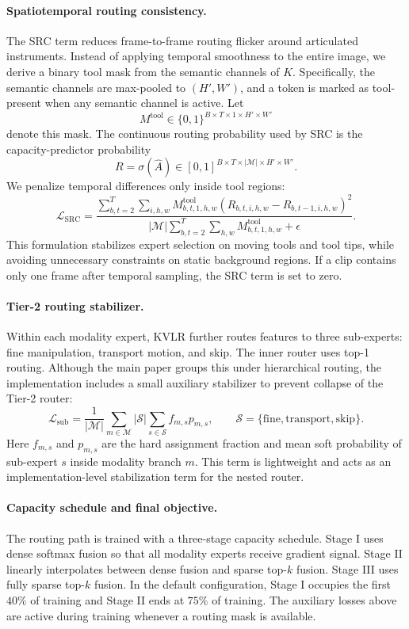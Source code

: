 \paragraph{Spatiotemporal routing consistency.}
The SRC term reduces frame-to-frame routing flicker around articulated instruments. Instead of applying temporal smoothness to the entire image, we derive a binary tool mask from the semantic channels of $K$. Specifically, the semantic channels are max-pooled to $(H',W')$, and a token is marked as tool-present when any semantic channel is active. Let
\[
    M^{\mathrm{tool}}\in\{0,1\}^{B\times T\times 1\times H'\times W'}
\]
denote this mask. The continuous routing probability used by SRC is the capacity-predictor probability
\[
    R=\sigma(\widehat{A})\in[0,1]^{B\times T\times |\mathcal{M}|\times H'\times W'} .
\]
We penalize temporal differences only inside tool regions:
\[
    \mathcal{L}_{\mathrm{SRC}}
    =
    \frac{
    \sum_{b,t=2}^{T}\sum_{i,h,w}
    M^{\mathrm{tool}}_{b,t,1,h,w}
    \left(R_{b,t,i,h,w}-R_{b,t-1,i,h,w}\right)^2
    }{
    |\mathcal{M}|\sum_{b,t=2}^{T}\sum_{h,w}M^{\mathrm{tool}}_{b,t,1,h,w}+\epsilon
    } .
\]
This formulation stabilizes expert selection on moving tools and tool tips, while avoiding unnecessary constraints on static background regions. If a clip contains only one frame after temporal sampling, the SRC term is set to zero.

\paragraph{Tier-2 routing stabilizer.}
Within each modality expert, KVLR further routes features to three sub-experts: fine manipulation, transport motion, and skip. The inner router uses top-1 routing. Although the main paper groups this under hierarchical routing, the implementation includes a small auxiliary stabilizer to prevent collapse of the Tier-2 router:
\[
    \mathcal{L}_{\mathrm{sub}}
    =
    \frac{1}{|\mathcal{M}|}\sum_{m\in\mathcal{M}}
    |\mathcal{S}|\sum_{s\in\mathcal{S}} f_{m,s}p_{m,s},
    \qquad
    \mathcal{S}=\{\mathrm{fine},\mathrm{transport},\mathrm{skip}\}.
\]
Here $f_{m,s}$ and $p_{m,s}$ are the hard assignment fraction and mean soft probability of sub-expert $s$ inside modality branch $m$. This term is lightweight and acts as an implementation-level stabilization term for the nested router.

\paragraph{Capacity schedule and final objective.}
The routing path is trained with a three-stage capacity schedule. Stage I uses dense softmax fusion so that all modality experts receive gradient signal. Stage II linearly interpolates between dense fusion and sparse top-$k$ fusion. Stage III uses fully sparse top-$k$ fusion. In the default configuration, Stage I occupies the first $40\%$ of training and Stage II ends at $75\%$ of training. The auxiliary losses above are active during training whenever a routing mask is available.

